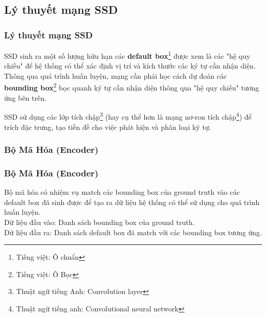 \documentclass{beamer}
\begin{document}
	\subsection{Lý thuyết mạng SSD}
	
	\frame{\tableofcontents[currentsection]}
	
	\begin{frame}
		\frametitle{Lý thuyết mạng SSD}
		
		SSD\cite{liu2016ssd} sinh ra một số lượng hữu hạn các \textbf{default box}\footnote{Tiếng việt: Ô chuẩn} được xem là các "hệ quy chiếu" để hệ thống có thể xác định vị trí và kích thước các ký tự cần nhận diện. Thông qua quá trình huấn luyện, mạng cần phải học cách dự đoán các \textbf{bounding box}\footnote{Tiếng việt: Ô Bọc} bọc quanh ký tự cần nhận diện thông qua "hệ quy chiếu" tương ứng bên trên.
		
		SSD\cite{liu2016ssd} sử dụng các lớp tích chập\footnote{Thuật ngữ tiếng Anh: Convolution layer} (hay cụ thể hơn là mạng nơ-ron tích chập\footnote{Thuật ngữ tiếng anh: Convolutional neural network}) để trích đặc trưng, tạo tiền đề cho việc phát hiện và phân loại ký tự. \\
		
	\end{frame}
	
	
	
	\subsubsection{Bộ Mã Hóa (Encoder)}
	
	\begin{frame}
		\frametitle{Bộ Mã Hóa (Encoder)}
		
		Bộ mã hóa có nhiệm vụ match các bounding box của ground truth vào các default box đã sinh được để tạo ra dữ liệu hệ thống có thể sử dụng cho quá trình huấn luyện.\\
		
		Dữ liệu đầu vào: Danh sách bounding box của ground truth.\\
		
		Dữ liệu đầu ra: Danh sách default box đã match với các bounding box tương ứng.
		
	\end{frame}
	
\end{document}
